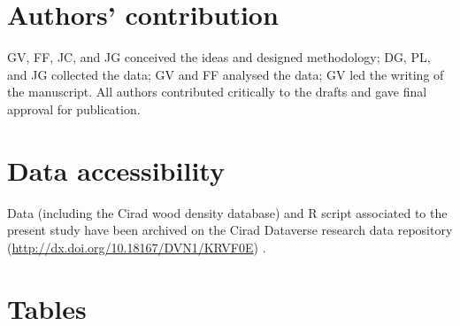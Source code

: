\documentclass[a4paper, 12pt, leqno, dvipsnames]{article}\usepackage[]{graphicx}\usepackage[]{color}
\begin{document}
\section{Authors' contribution}

GV, FF, JC, and JG conceived the ideas and designed methodology; DG, PL, and JG collected the data; GV and FF analysed the data; GV led the writing of the manuscript. All authors contributed critically to the drafts and gave final approval for publication.

\section{Data accessibility}

Data (including the Cirad wood density database) and R script associated to the present study have been archived on the Cirad Dataverse research data repository (\url{http://dx.doi.org/10.18167/DVN1/KRVF0E}) \citep{Vieilledent2017-CWDD}.


\newpage
\singlespacing




\newpage

\section{Tables}


\end{document}
